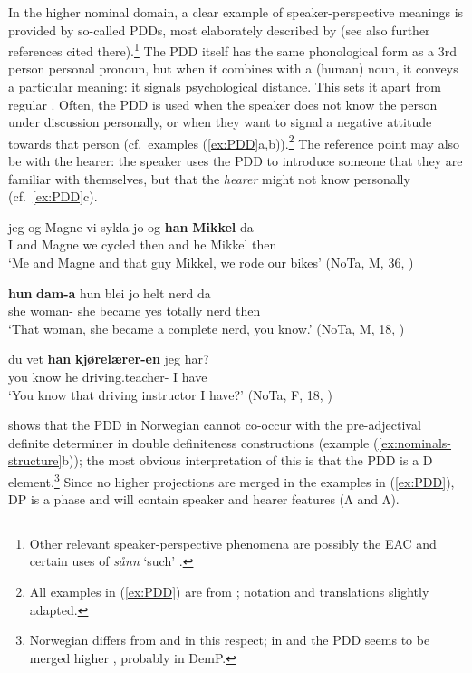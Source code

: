 \documentclass[output=paper]{langsci/langscibook}
\begin{document}
In the higher nominal domain, a clear example of speaker-perspective meanings
is provided by so-called \glspl{PDD}, most elaborately described by
\citet{johannessen2008psycological} (see also further references cited
there).\footnote{Other relevant speaker-perspective phenomena are possibly the
\gls{EAC} \parencite[294--297]{halmoy2016nominal} and certain uses of \emph{sånn}
`such' \parencite{johannessen2012modale}.}  The
\gls{PDD} itself has the same phonological form as a 3rd person personal
pronoun, but when it combines with a (human) noun, it conveys a particular
meaning: it signals psychological distance.  This  sets it apart from regular
. Often, the \gls{PDD} is used when the speaker does not know the
person under discussion personally, or when they want to signal a negative
attitude towards that person (cf.\ examples (\ref{ex:PDD}a,b)).\footnote{All
examples in (\ref{ex:PDD}) are from \citet{johannessen2008psycological};
notation and translations slightly adapted.} The reference point may also be
with the hearer: the speaker uses the \gls{PDD} to introduce someone that they
are familiar with themselves, but that the \emph{hearer} might not know
personally  (cf.\ \ref{ex:PDD}c).

\ea \label{ex:PDD} 
    \ea
    \gll jeg og Magne vi sykla jo og \textbf{han} \textbf{Mikkel} da\\
    I and Magne we cycled then and he Mikkel then\\
    \glt `Me and Magne and that guy Mikkel, we rode  our bikes' (NoTa, M, 36, \citealt[164]{johannessen2008psycological}	)

\ex
\gll \textbf{hun} \textbf{dam-a} hun blei jo helt nerd da\\
she woman-\Def{} she became yes totally nerd then\\
\glt `That woman, she became a complete nerd, you know.' (NoTa, M, 18, \citealt[166]{johannessen2008psycological})

	\ex
\gll du vet \textbf{han} \textbf{kj\o{}rel\ae{}rer-en} jeg har?\\
you know he driving.teacher-\Def{} I have\\
\glt `You know that driving instructor I have?' (NoTa, F, 18, \citealt[164]{johannessen2008psycological})
		\z
\z

\noindent \citet[178]{johannessen2008psycological} shows that the \gls{PDD} in
Norwegian cannot co-occur with the pre-adjectival definite determiner in double
definiteness constructions (example (\ref{ex:nominals-structure}b)); the most
obvious interpretation of this  is that the
\gls{PDD} is a D
element.\footnote{Norwegian differs from  and  in this
respect; in  and  the \gls{PDD} seems to be merged
higher \citep[175--176]{johannessen2008psycological}, probably in DemP.} Since
no higher projections are merged in the examples in (\ref{ex:PDD}), DP is a
phase and will contain speaker and hearer features (Λ and
Λ).
\end{document}
